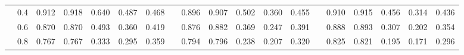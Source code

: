 \begin{table}
{\begin{tabular}{llccccccccccccccccc}
 & 0.4 & \cellcolor[HTML]{CDE9F2}0.912 & \cellcolor[HTML]{C4E5F0}0.918 & \cellcolor[HTML]{FEDD8D}0.640 & \cellcolor[HTML]{FEC475}0.487 & \cellcolor[HTML]{FEC173}0.468 & & \cellcolor[HTML]{DDF1F7}0.896 & \cellcolor[HTML]{D1EBF4}0.907 & \cellcolor[HTML]{FFCE7E}0.502 & \cellcolor[HTML]{FEBC6E}0.360 & \cellcolor[HTML]{FEC779}0.455 & & \cellcolor[HTML]{C6E6F1}0.910 & \cellcolor[HTML]{BFE3EF}0.915 & \cellcolor[HTML]{FFCB7C}0.456 & \cellcolor[HTML]{FEBB6D}0.314 & \cellcolor[HTML]{FEC879}0.436 \\
 & 0.6 & \cellcolor[HTML]{EFF8DF}0.870 & \cellcolor[HTML]{EFF8DF}0.870 & \cellcolor[HTML]{FEC576}0.493 & \cellcolor[HTML]{FEB567}0.360 & \cellcolor[HTML]{FEBB6D}0.419 & & \cellcolor[HTML]{E9F6E9}0.876 & \cellcolor[HTML]{E6F5EE}0.882 & \cellcolor[HTML]{FEBD6F}0.369 & \cellcolor[HTML]{FDB164}0.247 & \cellcolor[HTML]{FEC071}0.391 & & \cellcolor[HTML]{DEF2F7}0.888 & \cellcolor[HTML]{D9F0F6}0.893 & \cellcolor[HTML]{FEBA6C}0.307 & \cellcolor[HTML]{FDB163}0.202 & \cellcolor[HTML]{FEBF71}0.354 \\
 & 0.8 & \cellcolor[HTML]{FFF2AB}0.767 & \cellcolor[HTML]{FFF2AB}0.767 & \cellcolor[HTML]{FDB264}0.333 & \cellcolor[HTML]{FDAE61}0.295 & \cellcolor[HTML]{FEB567}0.359 & & \cellcolor[HTML]{FFFCBA}0.794 & \cellcolor[HTML]{FFFCBB}0.796 & \cellcolor[HTML]{FDB163}0.238 & \cellcolor[HTML]{FDAE61}0.207 & \cellcolor[HTML]{FEB86B}0.320 & & \cellcolor[HTML]{F9FCCD}0.825 & \cellcolor[HTML]{FAFCCB}0.821 & \cellcolor[HTML]{FDB063}0.195 & \cellcolor[HTML]{FDAE61}0.171 & \cellcolor[HTML]{FEB96B}0.296 \\
\hline
\hline
\end{tabular}%
}
\end{table}

